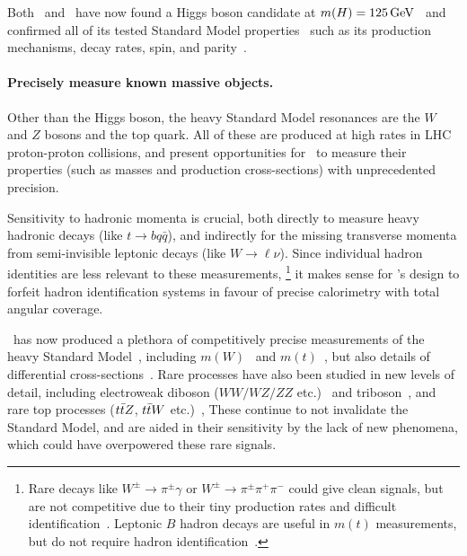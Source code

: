 Both \atlas\ and \cms\ have now found a Higgs boson candidate at
$m(H) = 125\,\eV[G]$~\cite{
atlas2012higgs,
atlas2012combined,
cms2012higgs
}
and confirmed all of its tested Standard Model properties~\cite{
combined2016higgs,
atlas2022ten,
cms2022ten
}
such as its production mechanisms, decay rates,
spin, and parity~\cite{
HIGG-2013-01,
HIGG-2013-17,
HIGG-2014-06
}.

\paragraph{Precisely measure known massive objects.}
Other than the Higgs boson, the heavy Standard Model resonances are the
$W$ and $Z$ bosons and the top quark.
All of these are produced at high rates in LHC proton-proton collisions,
and present opportunities for \atlas\ to measure their properties
(such as masses and production cross-sections) with unprecedented precision.

Sensitivity to hadronic momenta is crucial,
both directly to measure heavy hadronic decays
(like $t \to bq\bar{q}$),
and indirectly for the missing transverse momenta from semi-invisible
leptonic decays (like $W \to \ell\nu$).
Since individual hadron identities are less relevant to these measurements,%
\footnote{%
Rare decays like
$W^\pm \to \pi^\pm \gamma$ or $W^\pm \to \pi^\pm \pi^+ \pi^-$
could give clean signals, but are not competitive due to their
tiny production rates and difficult identification~\cite{
cdf1996search,
mangano2014wpiy,
cms2021wpiy
}.
Leptonic $B$ hadron decays are useful in $m(t)$ measurements, but do not
require hadron identification~\cite{
CDF:2009mbf,
CMS:2016ixg,
ATLAS:2022jbw
}.%
}
it makes sense for \atlas's design to forfeit hadron identification systems
in favour of precise calorimetry with total angular coverage.

\atlas\ has now produced a plethora of competitively precise measurements
of the heavy Standard Model~\cite{atlas2021summarysm},
including $m(W)$~\cite{atlas2018wmass} and
$m(t)$~\cite{atlas2022symmarytop, atlas2019topmass, TOPQ-2015-03},
but also details of differential cross-sections~\cite{
STDM-2016-11,
STDM-2016-14,
TOPQ-2018-15,
TOPQ-2016-10
}.
Rare processes have also been studied in new levels of detail,
including
electroweak diboson ($WW/WZ/ZZ$ etc.)~\cite{
STDM-2015-21,
STDM-2015-23,
STDM-2017-09
}
and triboson~\cite{
STDM-2016-06,
STDM-2017-22,
STDM-2019-09
},
and rare top processes
($\ttbar Z$, $\ttbar W$ etc.)~\cite{
TOPQ-2013-05,
TOPQ-2018-01,
TOPQ-2020-03
},
These continue to not invalidate the Standard Model, and are aided in their
sensitivity by the lack of new phenomena,
which could have overpowered these rare signals.

